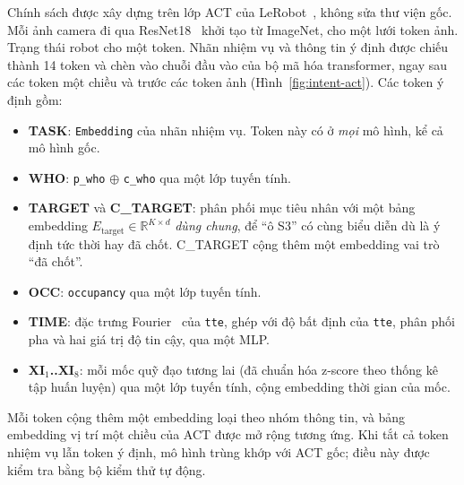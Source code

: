 Chính sách được xây dựng trên lớp ACT của LeRobot~\cite{cadene2026lerobot}, không sửa thư viện gốc. Mỗi ảnh camera đi qua ResNet18~\cite{he2016resnet} khởi tạo từ ImageNet, cho một lưới token ảnh. Trạng thái robot cho một token. Nhãn nhiệm vụ và thông tin ý định được chiếu thành 14 token và chèn vào chuỗi đầu vào của bộ mã hóa transformer, ngay sau các token một chiều và trước các token ảnh (Hình~\ref{fig:intent-act}). Các token ý định gồm:
\begin{itemize}
  \item \textbf{TASK}: \texttt{Embedding} của nhãn nhiệm vụ. Token này có ở \emph{mọi} mô hình, kể cả mô hình gốc.
  \item \textbf{WHO}: \texttt{p\_who} $\oplus$ \texttt{c\_who} qua một lớp tuyến tính.
  \item \textbf{TARGET} và \textbf{C\_TARGET}: phân phối mục tiêu nhân với một bảng embedding $E_\text{target} \in \mathbb{R}^{K\times d}$ \emph{dùng chung}, để ``ô S3'' có cùng biểu diễn dù là ý định tức thời hay đã chốt. C\_TARGET cộng thêm một embedding vai trò ``đã chốt''.
  \item \textbf{OCC}: \texttt{occupancy} qua một lớp tuyến tính.
  \item \textbf{TIME}: đặc trưng Fourier~\cite{tancik2020fourier} của \texttt{tte}, ghép với độ bất định của \texttt{tte}, phân phối pha và hai giá trị độ tin cậy, qua một MLP.
  \item \textbf{XI$_1$..XI$_8$}: mỗi mốc quỹ đạo tương lai (đã chuẩn hóa z-score theo thống kê tập huấn luyện) qua một lớp tuyến tính, cộng embedding thời gian của mốc.
\end{itemize}
Mỗi token cộng thêm một embedding loại theo nhóm thông tin, và bảng embedding vị trí một chiều của ACT được mở rộng tương ứng. Khi tắt cả token nhiệm vụ lẫn token ý định, mô hình trùng khớp với ACT gốc; điều này được kiểm tra bằng bộ kiểm thử tự động.

